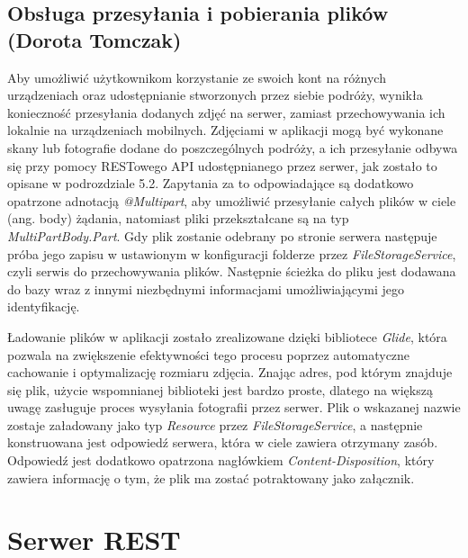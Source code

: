 \documentclass[10pt,twoside,a4paper]{report}
\begin{document}
\section{Obsługa przesyłania i pobierania plików (Dorota Tomczak)}
\par Aby umożliwić użytkownikom korzystanie ze swoich kont na różnych urządzeniach oraz udostępnianie stworzonych przez siebie podróży, wynikła konieczność przesyłania dodanych zdjęć na serwer, zamiast przechowywania ich lokalnie na urządzeniach mobilnych. Zdjęciami w aplikacji mogą być wykonane skany lub fotografie dodane do poszczególnych podróży, a ich przesyłanie odbywa się przy pomocy RESTowego API udostępnianego przez serwer, jak zostało to opisane w podrozdziale 5.2. Zapytania za to odpowiadające są dodatkowo opatrzone adnotacją \textit{@Multipart}, aby umożliwić przesyłanie całych plików w ciele (ang. body) żądania, natomiast pliki przekształcane są na typ \textit{MultiPartBody.Part}. Gdy plik zostanie odebrany po stronie serwera następuje próba jego zapisu w ustawionym w konfiguracji folderze przez \textit{FileStorageService}, czyli serwis do przechowywania plików. Następnie ścieżka do pliku jest dodawana do bazy wraz z innymi niezbędnymi informacjami umożliwiającymi jego identyfikację.

\par Ładowanie plików w aplikacji zostało zrealizowane dzięki bibliotece \textit{Glide}\cite{Glide}, która pozwala na zwiększenie efektywności tego procesu poprzez automatyczne cachowanie i optymalizację rozmiaru zdjęcia. Znając adres, pod którym znajduje się plik, użycie wspomnianej biblioteki jest bardzo proste, dlatego na większą uwagę zasługuje proces wysyłania fotografii przez serwer. Plik o wskazanej nazwie zostaje załadowany jako typ \textit{Resource} przez \textit{FileStorageService}, a następnie konstruowana jest odpowiedź serwera, która w ciele zawiera otrzymany zasób. Odpowiedź jest dodatkowo opatrzona nagłówkiem \textit{Content-Disposition}, który zawiera informację o tym, że plik ma zostać potraktowany jako załącznik. 


\chapter{Serwer REST}
\end{document}
